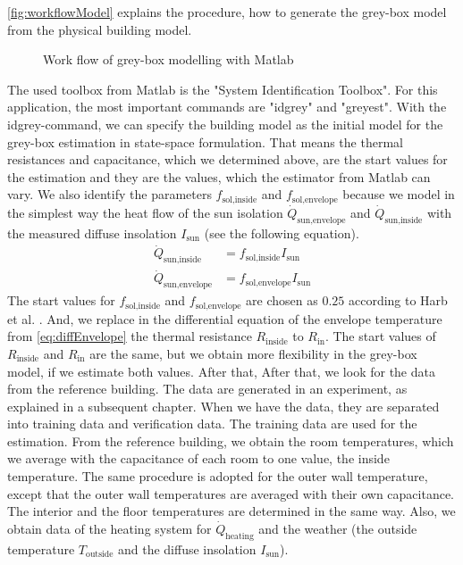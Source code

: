     \autoref{fig:workflowModel} explains the procedure, how to generate the grey-box model from the physical building model.\newline 
    \begin{figure}[h]
            \centering
            \def\svgwidth{400pt}
            
            \caption{Work flow of grey-box modelling with Matlab}
            \label{fig:workflowModel}
    \end{figure}
    The used toolbox from Matlab is the "System Identification Toolbox". For this application, the most important commands are "idgrey" and "greyest".
    With the idgrey-command, we can specify the building model as the initial model for the grey-box estimation in state-space formulation. That means the thermal resistances and capacitance, which we determined above, are the start values for the estimation and they are the values, which the estimator from Matlab can vary.
    We also identify the parameters $f_\text{sol,inside}$ and $f_\text{sol,envelope}$ because we model in the simplest way the heat flow of the sun isolation $\dot{Q}_\text{sun,envelope}$ and $\dot{Q}_\text{sun,inside}$ with the measured diffuse insolation $I_\text{sun}$ (see the following equation). 
    \begin{align}
       \label{eq:sun}
        \dot{Q}_\text{sun,inside} &= f_\text{sol,inside} I_\text{sun} \\
        \dot{Q}_\text{sun,envelope} &= f_\text{sol,envelope} I_\text{sun} \nonumber 
    \end{align}
    The start values for $f_\text{sol,inside}$ and $f_\text{sol,envelope}$ are chosen as $0.25$ according to Harb et al. \cite{Harb.2016}. And, we replace in the differential equation of the envelope temperature from \autoref{eq:diffEnvelope} the thermal resistance $R_\text{inside}$ to $R_\text{in}$. The start values of $R_\text{inside}$ and $R_\text{in}$ are the same, but we obtain more flexibility in the grey-box model, if we estimate both values.\newline
    After that, 
    After that, we look for the data from the reference building. The data are generated in an experiment, as explained in a subsequent chapter. When we have the data, they are separated into training data and verification data. The training data are used for the estimation. From the reference building, we obtain the room temperatures, which we average with the capacitance of each room to one value, the inside temperature. The same procedure is adopted for the outer wall temperature, except that the outer wall temperatures are averaged with their own capacitance. The interior and the floor temperatures are determined in the same way. Also, we obtain data of the heating system for $\dot{Q}_\text{heating}$ and the weather (the outside temperature $T_\text{outside}$ and the diffuse insolation $I_\text{sun}$). \newline
